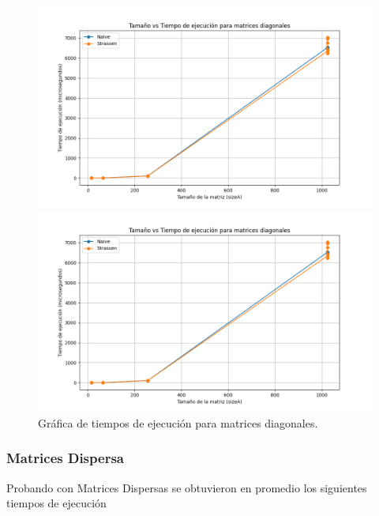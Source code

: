\begin{figure}[H]
    \centering
    \begin{minipage}[t]{0.5\textwidth}
        \includegraphics[width=\textwidth]{../code/matrix_multiplication/data/plots/diagonal_matrices_plot.png}
    \end{minipage}%
    \begin{minipage}[t]{0.5\textwidth}
        \includegraphics[width=\textwidth]{../code/matrix_multiplication/data/plots/diagonal_matrices_plot.png}
     \end{minipage}%
    \caption{Gráfica de tiempos de ejecución para matrices diagonales.}
    \label{fig:multi_diagonal}
\end{figure}

\newpage
\subsubsection*{Matrices Dispersa}

Probando con Matrices Dispersas  se obtuvieron en promedio los siguientes tiempos de ejecución

